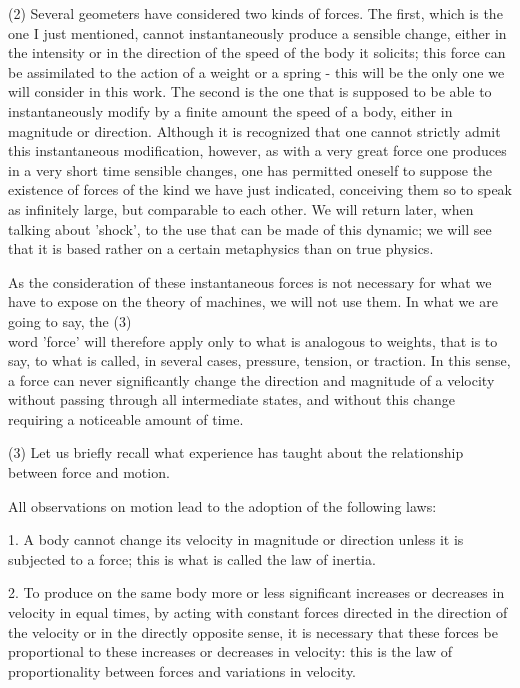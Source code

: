 \documentclass{book}
\begin{document}
(2) Several geometers have considered two kinds of forces. The first, which is the one I just mentioned, cannot instantaneously produce a sensible change, either in the intensity or in the direction of the speed of the body it solicits; this force can be assimilated to the action of a weight or a spring - this will be the only one we will consider in this work. The second is the one that is supposed to be able to instantaneously modify by a finite amount the speed of a body, either in magnitude or direction. Although it is recognized that one cannot strictly admit this instantaneous modification, however, as with a very great force one produces in a very short time sensible changes, one has permitted oneself to suppose the existence of forces of the kind we have just indicated, conceiving them so to speak as infinitely large, but comparable to each other. We will return later, when talking about 'shock', to the use that can be made of this dynamic; we will see that it is based rather on a certain metaphysics than on true physics.

As the consideration of these instantaneous forces is not necessary for what we have to expose on the theory of machines, we will not use them. In what we are going to say, the
\newpage
(3)
\\
word 'force' will therefore apply only to what is analogous to weights, that is to say, to what is called, in several cases, pressure, tension, or traction.
In this sense, a force can never significantly change the direction and magnitude of a velocity without passing through all intermediate states, and without this change requiring a noticeable amount of time.

(3) Let us briefly recall what experience has taught about the relationship between force and motion.

All observations on motion lead to the adoption of the following laws:

1. A body cannot change its velocity in magnitude or direction unless it is subjected to a force; this is what is called the law of inertia.

2. To produce on the same body more or less significant increases or decreases in velocity in equal times, by acting with constant forces directed in the direction of the velocity or in the directly opposite sense, it is necessary that these forces be proportional to these increases or decreases in velocity: this is the law of proportionality between forces and variations in velocity.
\end{document}
